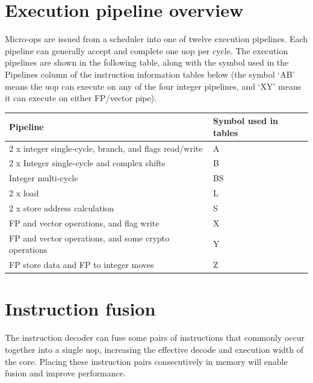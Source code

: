 \documentclass{article}
\begin{document}
\section{Execution pipeline overview}

Micro-ops are issued from a scheduler into one of twelve execution
pipelines. Each pipeline can generally accept and complete one uop per
cycle. The execution pipelines are shown in the following table, along
with the symbol used in the Pipelines column of the instruction
information tables below (the symbol ‘AB’ means the uop can execute on
any of the four integer pipelines, and ‘XY’ means it can execute on
either FP/vector pipe).

\begin{tabular}{|l|l|}
\hline
{\bf Pipeline} & {\bf Symbol used in tables} \\ 
\hline
2 x integer single-cycle, branch, and flags read/write & A  \\
2 x Integer single-cycle and complex shifts            & B  \\
Integer multi-cycle                                    & BS \\
2 x load                                               & L  \\
2 x store address calculation                          & S  \\
FP and vector operations, and flag write               & X  \\
FP and vector operations, and some crypto operations   & Y  \\
FP store data and FP to integer moves                  & Z \\
\hline 
\end{tabular}

\section{Instruction fusion}

The instruction decoder can fuse some pairs of instructions that
commonly occur together into a single uop, increasing the effective
decode and execution width of the core. Placing these instruction
pairs consecutively in memory will enable fusion and improve
performance. \\
\end{document}
